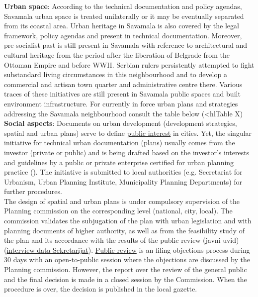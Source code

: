 \documentclass[11pt]{report}
\begin{document}
\begin{itemize}
\textbf{Urban space}:
According to the technical documentation and policy agendas, Savamala urban space is treated unilaterally or it may be eventually separated from its coastal area.
Urban heritage in Savamala is also covered by the legal framework, policy agendas and present in technical documentation.
Moreover, pre-socialist past is still present in Savamala with reference to architectural and cultural heritage from the period after the liberation of Belgrade from the Ottoman Empire and before WWII.
Serbian rulers persistently attempted to fight substandard living circumstances in this neighbourhood and to develop a commercial and artisan town quarter and administrative centre there.
Various traces of these initiatives are still present in Savamala public spaces and built environment infrastructure.  
For currently in force urban plans and strategies addressing the Savamala neighbourhood consult the table below (<hl{Table X}) %
\\

\textbf{Social aspects}:
Documents on urban development (development strategies, spatial and urban plans) serve to define  \underline{public interest} in cities.
Yet, the singular initiative for technical urban documentation (plans) usually comes from the investor (private or public) and is being drafted based on the investor's interests and guidelines by a public or private enterprise certified for urban planning practice (\href{ref}{\citealt{ministarstvo_prostora_urbani_2014}}). %
The initiative is submitted to local authorities (e.g. Secretariat for Urbanism, Urban Planning Institute, Municipality Planning Departments) for further procedures.
\\
The design of spatial and urban plans is under compulsory supervision of the Planning commission on the corresponding level (national, city, local). The commission validates the subjugation of the plan with urban legislation and with planning documents of higher authority, as well as from the feasibility study of the plan and its accordance with the results of the public review (javni uvid) (\href{ref}{interview data Sekretarijat}). 
\underline{Public review} is an filing objections process during 30 days with an open-to-public session where the objections are discussed by the Planning commission. However, the report over the review of the general public and the final decision is made in a closed session by the Commission. 
When the procedure is over, the decision is published in the local gazette.


\end{itemize}
\end{document}
